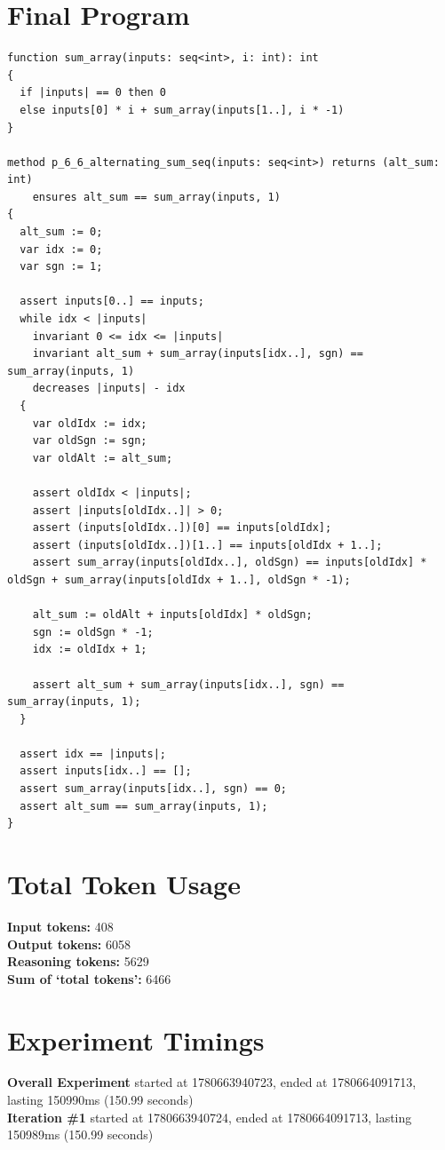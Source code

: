 \documentclass{article}
\begin{document}
\section*{Final Program}
\begin{lstlisting}
function sum_array(inputs: seq<int>, i: int): int
{
  if |inputs| == 0 then 0
  else inputs[0] * i + sum_array(inputs[1..], i * -1)
}

method p_6_6_alternating_sum_seq(inputs: seq<int>) returns (alt_sum: int)
	ensures alt_sum == sum_array(inputs, 1)
{
  alt_sum := 0;
  var idx := 0;
  var sgn := 1;

  assert inputs[0..] == inputs;
  while idx < |inputs|
    invariant 0 <= idx <= |inputs|
    invariant alt_sum + sum_array(inputs[idx..], sgn) == sum_array(inputs, 1)
    decreases |inputs| - idx
  {
    var oldIdx := idx;
    var oldSgn := sgn;
    var oldAlt := alt_sum;

    assert oldIdx < |inputs|;
    assert |inputs[oldIdx..]| > 0;
    assert (inputs[oldIdx..])[0] == inputs[oldIdx];
    assert (inputs[oldIdx..])[1..] == inputs[oldIdx + 1..];
    assert sum_array(inputs[oldIdx..], oldSgn) == inputs[oldIdx] * oldSgn + sum_array(inputs[oldIdx + 1..], oldSgn * -1);

    alt_sum := oldAlt + inputs[oldIdx] * oldSgn;
    sgn := oldSgn * -1;
    idx := oldIdx + 1;

    assert alt_sum + sum_array(inputs[idx..], sgn) == sum_array(inputs, 1);
  }

  assert idx == |inputs|;
  assert inputs[idx..] == [];
  assert sum_array(inputs[idx..], sgn) == 0;
  assert alt_sum == sum_array(inputs, 1);
}
\end{lstlisting}
\section*{Total Token Usage}
\textbf{Input tokens: }408
\\\textbf{Output tokens: }6058
\\\textbf{Reasoning tokens: }5629
\\\textbf{Sum of `total tokens': }6466
\section*{Experiment Timings}
\textbf{Overall Experiment} started at 1780663940723, ended at 1780664091713, lasting 150990ms (150.99 seconds)
\\\textbf{Iteration \#1} started at 1780663940724, ended at 1780664091713, lasting 150989ms (150.99 seconds)
\end{document}
